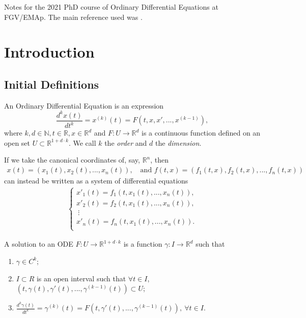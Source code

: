 Notes for the 2021 PhD course of Ordinary Differential Equations
at FGV/EMAp. The main reference used was \citet{doering2008equaccoes}.

\section{Introduction}

\subsection{Initial Definitions}
\begin{definition}[ODE]
  An Ordinary Differential Equation is an expression
  \begin{displaymath}
    \frac{d^k x(t)}{dt^k} = x^{(k)}(t) = F(t,x,x',...,x^{(k-1)}),
  \end{displaymath}
  where $k,d \in \mathbb N, t \in \mathbb R, x \in \mathbb R^d$ and $F:U\to \mathbb R^d$ is a continuous
  function defined on an open set $U \subset \mathbb R^{1+d\cdot k}$.
  We call $k$ the \textit{order} and $d$ the \textit{dimension}.
\end{definition}

If we take the canonical coordinates of, say, $\mathbb R^n$, then
\begin{align*}
  x(t) = (x_1(t), x_2(t),...,x_n(t)),\quad \text{and }
  f(t,x) = (f_1(t,x), f_2(t,x),...,f_n(t,x))
\end{align*}
can instead be written as a system of differential equations
\begin{align}
  \begin{cases}
    x'_1(t) = f_1(t,x_1(t),...,x_n(t)),\\
    x'_2(t) = f_2(t,x_1(t),...,x_n(t)),\\
    \ \vdots\\
    x'_n(t) = f_n(t,x_1(t),...,x_n(t)).\\
  \end{cases}
\end{align}


\begin{definition}
  A solution to an ODE $F:U\to \mathbb R^{1+d\cdot k}$ is a function
  $\gamma : I \to \mathbb R^d$ such that
  \begin{enumerate}
    \item $\gamma \in C^k$;
    \item $I\subset R$ is an open interval such that $\forall t \in I$,
      $(t,\gamma(t),\gamma'(t),...,\gamma^{(k-1)}(t))\subset U$;
    \item $\frac{d^k\gamma(t)}{dt^ k} = \gamma^{(k)}(t) = F(t,\gamma'(t),...,\gamma^{(k-1)}(t)), \ \forall t \in I$.
  \end{enumerate}
\end{definition}

